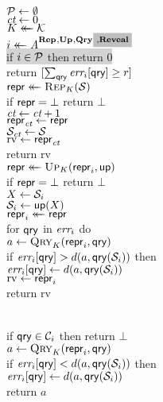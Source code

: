 \begin{figure*}[t]
  {
     \\[2pt]
      $\setP \gets \emptyset$\\
      $\ct \gets 0$ \\
      $\key \getsr \keys$\\
      $i \getsr \advA^{\REPO,\UPO,\QRYO\highlighto{,\REVO}}$\\
      \colorbox{lightgray}{if $i \in \setP$ then return 0} \\[2.0pt]
      return $[\sum_\qry \err_i[\qry] \geq r]$ 
 }
{
    \oraclev{$\REPO(\col)$}\\[2pt]
      $\pub \getsr \Rep_\key(\col)$\\
      if $\pub = \bot$ return $\bot$\\
      $\ct\gets\ct+1$ \\
      $\pub_\ct \gets \pub$\\
      $\col_\ct \gets \col$\\
      $\mathrm{rv} \gets \pub_\ct$  \\
      return $\mathrm{rv}$
  }
  {
    \\[2pt]
      $\pub \getsr \Up_\key(\pub_i, \up)$\\
      if $\pub = \bot$ return $\bot$\\
      $X \gets \col_i$ \\
      $\col_i \gets \up(X)$\\
      $\pub_i \getsr \pub$\\
      for $\qry$ in $\err_i$ do\\
      \tab $a \gets \Qry_K(\pub_i, \qry)$\\
      \tab if $\err_i[\qry] > d(a,\qry(\col_i))$ then\\
      \tab\tab$\err_i[\qry] \gets d(a,\qry(\col_i))$\\
      $\mathrm{rv} \gets \pub_i$ \\
      return $\mathrm{rv}$
      \medskip
}
{
    \\[2pt]
      if $\qry \in \setC_i$ then return $\bot$\\
      $a \gets \Qry_K(\pub_i, \qry)$\\
      if $\err_i[\qry] < d(a,\qry(\col_i))$ then\\
      \tab$\err_i[\qry] \gets d(a,\qry(\col_i))$\\
      return $a$


}
\end{figure*}
